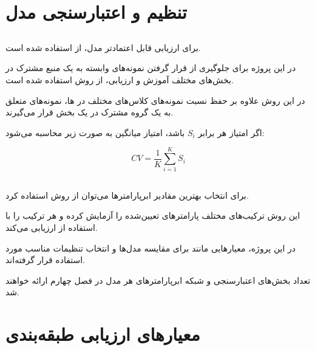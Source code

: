 \documentclass[12pt,a4paper,oneside]{report}
\begin{document}
\section{تنظیم و اعتبارسنجی مدل}


\subsection{}

برای ارزیابی قابل اعتمادتر مدل، از
استفاده شده است.

در این پروژه برای جلوگیری از قرار گرفتن نمونه‌های وابسته به یک منبع مشترک در بخش‌های مختلف آموزش و ارزیابی، از روش
استفاده شده است.

در این روش علاوه بر حفظ نسبت نمونه‌های کلاس‌های مختلف در
ها، نمونه‌های متعلق به یک گروه مشترک در یک بخش قرار می‌گیرند.

اگر امتیاز هر
برابر $S_i$ باشد، امتیاز میانگین به صورت زیر محاسبه می‌شود:

\begin{equation}
CV
=
\frac{1}{K}
\sum_{i=1}^{K}
S_i
\end{equation}


\subsection{}

برای انتخاب بهترین مقادیر ابرپارامترها می‌توان از روش
استفاده کرد.

این روش ترکیب‌های مختلف پارامترهای تعیین‌شده را آزمایش کرده و هر ترکیب را با استفاده از
ارزیابی می‌کند.

در این پروژه، معیارهایی مانند
برای مقایسه مدل‌ها و انتخاب تنظیمات مناسب مورد استفاده قرار گرفته‌اند.

تعداد بخش‌های اعتبارسنجی و شبکه ابرپارامترهای هر مدل در فصل چهارم ارائه خواهند شد.

\section{معیارهای ارزیابی طبقه‌بندی}
\end{document}
